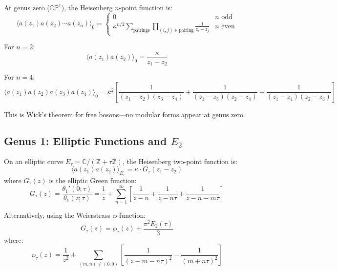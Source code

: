 \begin{theorem}\label{thm:heisenberg-genus-zero}
At genus zero ($\mathbb{CP}^1$), the Heisenberg $n$-point function is:
\begin{equation}
\langle a(z_1) a(z_2) \cdots a(z_n) \rangle_0 = 
\begin{cases}
0 & n \text{ odd} \\
\kappa^{n/2} \sum_{\text{pairings}} \prod_{(i,j) \in \text{pairing}} \frac{1}{z_i - z_j} 
& n \text{ even}
\end{cases}
\end{equation}

For $n=2$:
$$\langle a(z_1) a(z_2) \rangle_0 = \frac{\kappa}{z_1 - z_2}$$

For $n=4$:
$$\langle a(z_1) a(z_2) a(z_3) a(z_4) \rangle_0 = \kappa^2 \left[
\frac{1}{(z_1-z_2)(z_3-z_4)} + \frac{1}{(z_1-z_3)(z_2-z_4)} + 
\frac{1}{(z_1-z_4)(z_2-z_3)}
\right]$$

This is Wick's theorem for free bosons---no modular forms appear at genus zero.
\end{theorem}

\subsection{Genus 1: Elliptic Functions and $E_2$}
\label{subsec:heisenberg-genus-one-complete}

\begin{theorem}\label{thm:heisenberg-genus-one-complete}
On an elliptic curve $E_\tau = \mathbb{C}/(\mathbb{Z} + \tau\mathbb{Z})$, the 
Heisenberg two-point function is:
\begin{equation}
\langle a(z_1) a(z_2) \rangle_{E_\tau} = \kappa \cdot G_\tau(z_1 - z_2)
\end{equation}
where $G_\tau(z)$ is the elliptic Green function:
\begin{equation}
G_\tau(z) = \frac{\theta_1'(0; \tau)}{\theta_1(z; \tau)} 
= \frac{1}{z} + \sum_{n=1}^{\infty} \left[\frac{1}{z-n} + \frac{1}{z-n\tau} 
+ \frac{1}{z-n-m\tau}\right]
\end{equation}

Alternatively, using the Weierstrass $\wp$-function:
\begin{equation}
G_\tau(z) = \wp_\tau(z) + \frac{\pi^2 E_2(\tau)}{3}
\end{equation}
where:
\begin{equation}
\wp_\tau(z) = \frac{1}{z^2} + \sum_{(m,n) \neq (0,0)} \left[
\frac{1}{(z - m - n\tau)^2} - \frac{1}{(m+n\tau)^2}
\right]
\end{equation}
\end{theorem}

